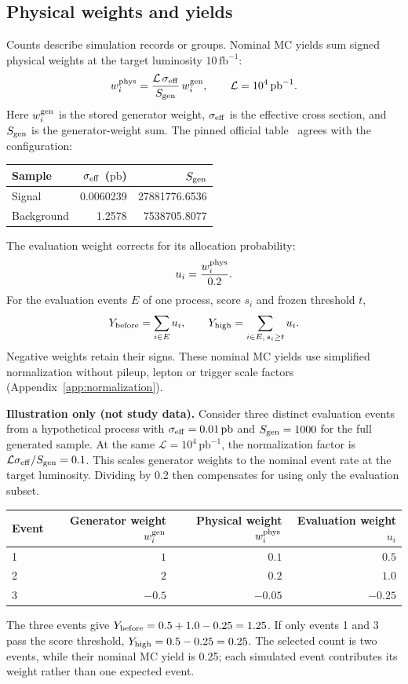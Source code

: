 \documentclass[11pt,a4paper]{article}
\begin{document}
\subsection{Physical weights and yields}\label{sec:weights}
Counts describe simulation records or groups. Nominal MC yields sum signed physical weights at the target luminosity $10\,\mathrm{fb}^{-1}$:
\[
 w_i^{\rm phys}=\frac{\mathcal L\,\sigma_{\rm eff}}{S_{\rm gen}}\,w_i^{\rm gen},
 \qquad \mathcal L=10^4\,\mathrm{pb}^{-1}.
\]
Here $w_i^{\rm gen}$ is the stored generator weight, $\sigma_{\rm eff}$ is the effective cross section, and $S_{\rm gen}$ is the generator-weight sum.
The pinned official table~\cite{SampleInfo} agrees with the configuration:
\begin{center}
\small
\begin{tabular}{lrr}
\toprule
Sample & $\sigma_{\rm eff}$ ($\mathrm{pb}$) & $S_{\rm gen}$ \\
\midrule
Signal & 0.0060239 & 27881776.6536 \\
Background & 1.2578 & 7538705.8077 \\
\bottomrule
\end{tabular}
\end{center}
The evaluation weight corrects for its allocation probability:
\[
 u_i=\frac{w_i^{\rm phys}}{0.2}.
\]
For the evaluation events $E$ of one process, score $s_i$ and frozen threshold $t$,
\[
 Y_{\rm before}=\sum_{i\in E}u_i,\qquad
 Y_{\rm high}=\sum_{i\in E,\,s_i\geq t}u_i.
\]
Negative weights retain their signs. These nominal MC yields use simplified normalization without pileup, lepton or trigger scale factors (Appendix~\ref{app:normalization}).

\textbf{Illustration only (not study data).}
Consider three distinct evaluation events from a hypothetical process with $\sigma_{\rm eff}=0.01\,\mathrm{pb}$ and $S_{\rm gen}=1000$ for the full generated sample.
At the same $\mathcal L=10^4\,\mathrm{pb}^{-1}$, the normalization factor is $\mathcal L\sigma_{\rm eff}/S_{\rm gen}=0.1$.
This scales generator weights to the nominal event rate at the target luminosity. Dividing by 0.2 then compensates for using only the evaluation subset.
\begin{center}
\small
\begin{tabular}{lrrr}
\toprule
Event & Generator weight $w_i^{\rm gen}$ & Physical weight $w_i^{\rm phys}$ & Evaluation weight $u_i$ \\
\midrule
1 & $1$ & $0.1$ & $0.5$ \\
2 & $2$ & $0.2$ & $1.0$ \\
3 & $-0.5$ & $-0.05$ & $-0.25$ \\
\bottomrule
\end{tabular}
\end{center}
The three events give $Y_{\rm before}=0.5+1.0-0.25=1.25$.
If only events 1 and 3 pass the score threshold, $Y_{\rm high}=0.5-0.25=0.25$.
The selected count is two events, while their nominal MC yield is 0.25; each simulated event contributes its weight rather than one expected event.
\end{document}
